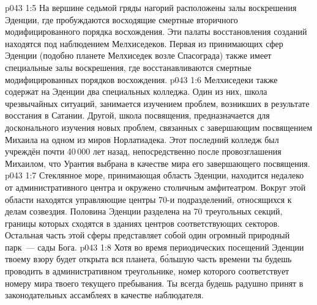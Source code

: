 \vs p043 1:5 \pc На вершине седьмой гряды нагорий расположены залы воскрешения Эденции, где пробуждаются восходящие смертные вторичного модифицированного порядка восхождения. Эти палаты восстановления созданий находятся под наблюдением Мелхиседеков. Первая из принимающих сфер Эденции (подобно планете Мелхиседек возле Спасограда) также имеет специальные залы воскрешения, где восстанавливаются смертные модифицированных порядков восхождения.
\vs p043 1:6 Мелхиседеки также содержат на Эденции два специальных колледжа. Один из них, школа чрезвычайных ситуаций, занимается изучением проблем, возникших в результате восстания в Сатании. Другой, школа посвящения, предназначается для досконального изучения новых проблем, связанных с завершающим посвящением Михаила на одном из миров Норлатиадека. Этот последний колледж был учреждён почти 40\,000 лет назад, непосредственно после провозглашения Михаилом, что Урантия выбрана в качестве мира его завершающего посвящения.
\vs p043 1:7 \pc Стеклянное море, принимающая область Эденции, находится недалеко от административного центра и окружено столичным амфитеатром. Вокруг этой области находятся управляющие центры 70-и подразделений, относящихся к делам созвездия. Половина Эденции разделена на 70 треугольных секций, границы которых сходятся в зданиях центров соответствующих секторов. Остальная часть этой сферы представляет собой один огромный природный парк~--- сады Бога.
\vs p043 1:8 Хотя во время периодических посещений Эденции твоему взору будет открыта вся планета, б\'ольшую часть времени ты будешь проводить в административном треугольнике, номер которого соответствует номеру мира твоего текущего пребывания. Ты всегда будешь радушно принят в законодательных ассамблеях в качестве наблюдателя.
